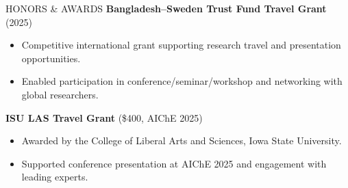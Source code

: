 \documentclass{resume} %
\begin{document}
\begin{rSection}{HONORS \& AWARDS}
\textbf{Bangladesh–Sweden Trust Fund Travel Grant} (2025)
\begin{itemize}
    \item Competitive international grant supporting research travel and presentation opportunities.
    \item Enabled participation in conference/seminar/workshop and networking with global researchers.
\end{itemize}

\textbf{ISU LAS Travel Grant} (\$400, AIChE 2025)
\begin{itemize}
    \item Awarded by the College of Liberal Arts and Sciences, Iowa State University.
    \item Supported conference presentation at AIChE 2025 and engagement with leading experts.
\end{itemize}

\end{rSection}

\end{document}
